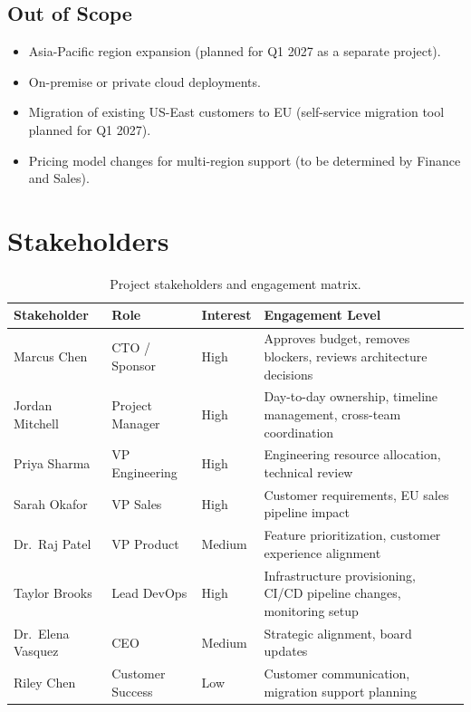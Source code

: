\documentclass[
    language=english,
    doctype=project-charter,
    institution=none,
]{../../omnilatex}
\begin{document}
\subsection{Out of Scope}

\begin{itemize}
    \item Asia-Pacific region expansion (planned for Q1 2027 as a separate
          project).
    \item On-premise or private cloud deployments.
    \item Migration of existing US-East customers to EU (self-service
          migration tool planned for Q1 2027).
    \item Pricing model changes for multi-region support (to be determined
          by Finance and Sales).
\end{itemize}

\section{Stakeholders}

\begin{table}[h]
    \centering
    \begin{tabular}{lllp{4cm}}
        \toprule
        \textbf{Stakeholder} & \textbf{Role} & \textbf{Interest} & \textbf{Engagement Level} \\
        \midrule
        Marcus Chen       & CTO / Sponsor      & High   & Approves budget, removes
            blockers, reviews architecture decisions \\
        Jordan Mitchell   & Project Manager    & High   & Day-to-day ownership,
            timeline management, cross-team coordination \\
        Priya Sharma      & VP Engineering     & High   & Engineering resource
            allocation, technical review \\
        Sarah Okafor      & VP Sales           & High   & Customer requirements,
            EU sales pipeline impact \\
        Dr.\ Raj Patel    & VP Product         & Medium & Feature prioritization,
            customer experience alignment \\
        Taylor Brooks     & Lead DevOps        & High   & Infrastructure provisioning,
            CI/CD pipeline changes, monitoring setup \\
        Dr.\ Elena Vasquez & CEO               & Medium & Strategic alignment,
            board updates \\
        Riley Chen        & Customer Success   & Low    & Customer communication,
            migration support planning \\
        \bottomrule
    \end{tabular}
    \caption{Project stakeholders and engagement matrix.}
\end{table}
\end{document}
